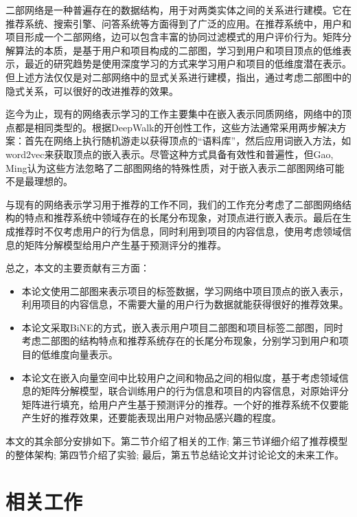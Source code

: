 \documentclass[lang=cn,11pt]{elegantpaper}
\begin{document}
二部网络是一种普遍存在的数据结构，用于对两类实体之间的关系进行建模。它在推荐系统、搜索引擎、问答系统等方面得到了广泛的应用。在推荐系统中，用户和项目形成一个二部网络，边可以包含丰富的协同过滤模式的用户评价行为\cite{He2017a}。矩阵分解算法的本质，是基于用户和项目构成的二部图，学习到用户和项目顶点的低维表示，最近的研究趋势是使用深度学习的方式来学习用户和项目的低维度潜在表示\cite{He2017}。但上述方法仅仅是对二部网络中的显式关系进行建模，\cite{Yu2018,Pongnumkul2018}指出，通过考虑二部图中的隐式关系，可以很好的改进推荐的效果。

迄今为止，现有的网络表示学习的工作主要集中在嵌入表示同质网络，网络中的顶点都是相同类型的\cite{Grover2016,Perozzi2014,Liao2018}。根据DeepWalk\cite{Perozzi2014}的开创性工作，这些方法通常采用两步解决方案：首先在网络上执行随机游走以获得顶点的“语料库”，然后应用词嵌入方法，如word2vec\cite{Mikolov2013}来获取顶点的嵌入表示。尽管这种方式具备有效性和普遍性，但Gao, Ming\cite{Gao2018}认为这些方法忽略了二部图网络的特殊性质，对于嵌入表示二部图网络可能不是最理想的。

与现有的网络表示学习用于推荐的工作不同\cite{Barkan2016}，我们的工作充分考虑了二部图网络结构的特点和推荐系统中领域存在的长尾分布现象，对顶点进行嵌入表示。最后在生成推荐时不仅考虑用户的行为信息，同时利用到项目的内容信息，使用考虑领域信息的矩阵分解模型给用户产生基于预测评分的推荐。

总之，本文的主要贡献有三方面：
\begin{itemize}
	\item 本论文使用二部图来表示项目的标签数据，学习网络中项目顶点的嵌入表示，利用项目的内容信息，不需要大量的用户行为数据就能获得很好的推荐效果。
	
	\item 本论文采取BiNE\cite{Gao2018}的方式，嵌入表示用户项目二部图和项目标签二部图，同时考虑二部图的结构特点和推荐系统存在的长尾分布现象，分别学习到用户和项目的低维度向量表示。
	
	\item 本论文在嵌入向量空间中比较用户之间和物品之间的相似度，基于考虑领域信息的矩阵分解模型，联合训练用户的行为信息和项目的内容信息，对原始评分矩阵进行填充，给用户产生基于预测评分的推荐。一个好的推荐系统不仅要能产生好的推荐效果，还要能表现出用户对物品感兴趣的程度。
\end{itemize}

本文的其余部分安排如下。第二节介绍了相关的工作; 第三节详细介绍了推荐模型的整体架构; 第四节介绍了实验; 最后，第五节总结论文并讨论论文的未来工作。


\section{相关工作}
\end{document}
